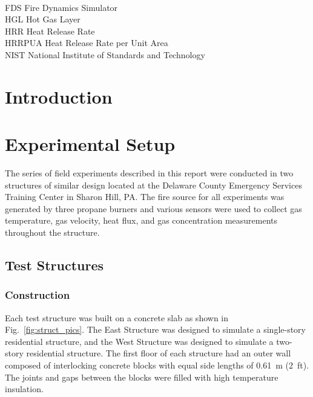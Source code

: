\documentclass[12pt,oneside]{book}
\begin{document}
\begin{tabbing}
\hspace{1.5in} \= \\
FDS \> Fire Dynamics Simulator \\
HGL \> Hot Gas Layer \\
HRR \> Heat Release Rate \\
HRRPUA \> Heat Release Rate per Unit Area \\
NIST \> National Institute of Standards and Technology \\
\end{tabbing}

\mainmatter

\chapter{Introduction}
\label{chap:Introduction}

\chapter{Experimental Setup}
\label{chap:Experimental_Setup}
The series of field experiments described in this report were conducted in two structures of similar design located at the Delaware County Emergency Services Training Center in Sharon Hill, PA. The fire source for all experiments was generated by three propane burners and various sensors were used to collect gas temperature, gas velocity, heat flux, and gas concentration measurements throughout the structure.

\section{Test Structures}
\label{sec:Test_Structures}

\subsection{Construction}
\label{sec:construction}
Each test structure was built on a concrete slab as shown in Fig.~\ref{fig:struct_pics}. The East Structure was designed to simulate a single-story residential structure, and the West Structure was designed to simulate a two-story residential structure. The first floor of each structure had an outer wall composed of interlocking concrete blocks with equal side lengths of 0.61~m (2~ft). The joints and gaps between the blocks were filled with high temperature insulation.
\end{document}
